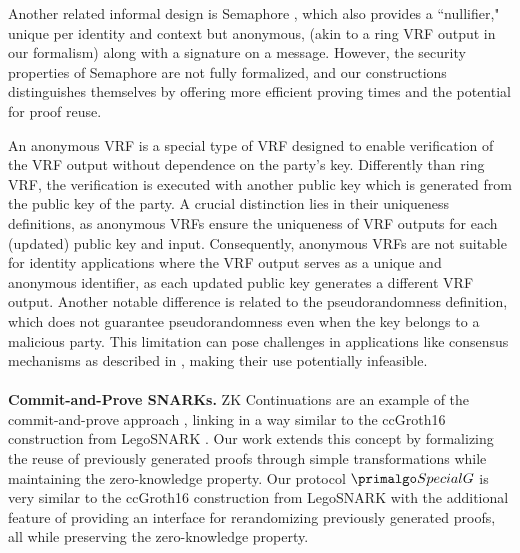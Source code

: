 Another related informal design is Semaphore \cite{Semaphore}, which also provides a ``nullifier," unique per identity and context but anonymous, (akin to a ring VRF output in our formalism) along with a signature on a message. However, the security properties of Semaphore are not fully formalized, and our constructions distinguishes themselves by offering more efficient proving times and the potential for proof reuse.

An anonymous VRF \cite{anonymousVRF} is a special type of VRF designed to enable verification of the VRF output without dependence on the party's key.  Differently than ring VRF, the verification is executed with another public key which is generated from the public key of the party.  A crucial distinction lies in their  uniqueness definitions, as anonymous VRFs ensure the uniqueness of VRF outputs for each (updated) public key and input. Consequently, anonymous VRFs are not suitable for identity applications where the VRF output serves as a unique and anonymous identifier, as each updated public key generates a different VRF output.
Another notable difference is related to the pseudorandomness definition, which does not guarantee pseudorandomness even when the key belongs to a malicious party. This limitation can pose challenges in applications like consensus mechanisms as described in \cite{anonymousVRF}, making their use potentially infeasible.
\\\\
\noindent\textbf{Commit-and-Prove SNARKs.} ZK Continuations are an example of the commit-and-prove approach \cite{LegoSNARK}, linking  in a way similar to the ccGroth16 construction from LegoSNARK \cite{LegoSNARK}. Our work extends this concept by formalizing the reuse of previously generated proofs through simple transformations while maintaining the zero-knowledge property. Our protocol $ \SpecialG $ is very similar to the ccGroth16 construction from LegoSNARK \cite{LegoSNARK} with the additional feature of providing an interface for rerandomizing previously generated proofs, all while preserving the zero-knowledge property.